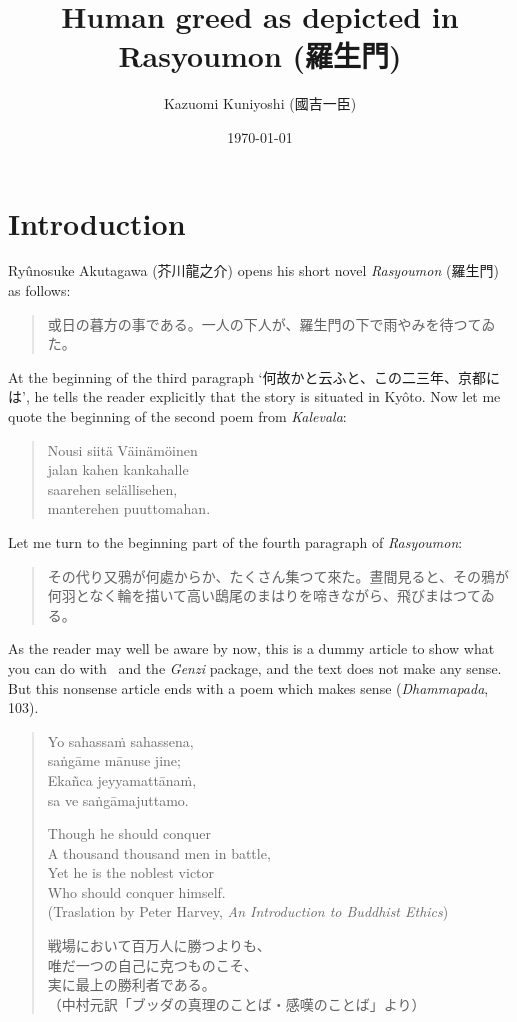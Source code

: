 \documentclass{article}
\title{Human greed as depicted in Rasyoumon (羅生門)}
\author{Kazuomi Kuniyoshi (國吉一臣)}
\date{\today}
\begin{document}
\maketitle
\section*{Introduction}
Ryûnosuke Akutagawa (芥川龍之介) opens his short novel \textit{Rasyoumon} (羅生門) as follows:
\begin{quote}
或日の暮方の事である。一人の下人が、羅生門の下で雨やみを待つてゐた。
\end{quote}
At the beginning of the third paragraph ‘何故かと云ふと、この二三年、京都には’, he tells the reader explicitly that the story is situated in Kyôto. Now let me quote the beginning of the second poem from \textit{Kalevala}:
\begin{verse}
Nousi siitä Väinämöinen\\
jalan kahen kankahalle\\
saarehen selällisehen,\\
manterehen puuttomahan.
\end{verse}
Let me turn to the beginning part of the fourth paragraph of \textit{Rasyoumon}:
\begin{quote}
\begin{ja}
その代り又鴉が何處からか、たくさん集つて來た。晝間見ると、その鴉が何羽となく輪を描いて高い鴟尾のまはりを啼きながら、飛びまはつてゐる。
\end{ja}
\end{quote}

As the reader may well be aware by now, this is a dummy article to show what you can do with \XeLaTeX\ and the \textit{Genzi} package, and the text does not make any sense. But this nonsense article ends with a poem which makes sense (\textit{Dhammapada}, 103).
\begin{verse}
{Yo sahassaṁ sahassena,\\saṅgāme mānuse jine;\\Ekañca jeyyamattānaṁ,\\sa ve saṅgāmajuttamo.}

Though he should conquer\\
A thousand thousand men in battle,\\
Yet he is the noblest victor\\
Who should conquer himself.\\
\quad\quad (Traslation by Peter Harvey, \textit{An Introduction to Buddhist Ethics})

戦場において百万人に勝つよりも、\\
唯だ一つの自己に克つものこそ、\\
実に最上の勝利者である。\\
\quad\quad（中村元訳「ブッダの真理のことば・感嘆のことば」より）
\end{verse}
\end{document}
